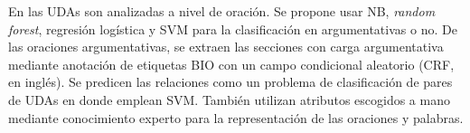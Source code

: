 \documentclass[a4paper,11pt,twocolumn,twoside]{article}
\begin{document}

En \cite{goudas2015argument} las UDAs son analizadas a nivel de oración.
Se propone usar NB, \textit{random forest}, regresión logística y SVM 
para la clasificación en argumentativas o no. De las oraciones argumentativas,
se extraen las secciones con carga argumentativa mediante anotación de etiquetas 
BIO con un campo condicional aleatorio (CRF, en inglés). Se predicen las relaciones como un 
problema de clasificación de pares de UDAs en donde emplean SVM. También
utilizan atributos escogidos a mano mediante conocimiento experto para la representación de 
las oraciones y palabras.

\end{document}

